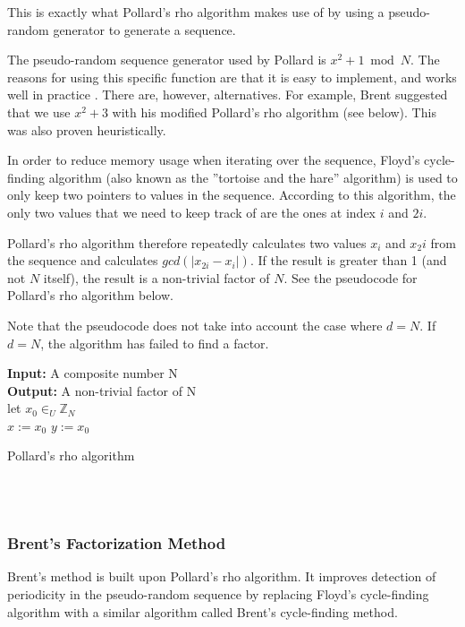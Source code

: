 \documentclass[paper=a4, fontsize=11pt,numbers=endperiod]{scrartcl} %
\providecommand{\abs}[1]{\lvert#1\rvert} %
\numberwithin{equation}{section} %
\numberwithin{figure}{section} %
\numberwithin{table}{section} %
\begin{document}
This is exactly what Pollard's rho algorithm makes use of by using a pseudo-random generator to generate a sequence.

The pseudo-random sequence generator used by Pollard is $x^2 + 1 \bmod N$. The reasons for using this specific function are that it is easy to implement, and works well in practice \cite{algnotes}. There are, however, alternatives. For example, Brent suggested that we use $x^2 +3$ with his modified Pollard's rho algorithm (see below). This was also proven heuristically. \cite{brent}

In order to reduce memory usage when iterating over the sequence, Floyd's cycle-finding algorithm (also known as the ''tortoise and the hare'' algorithm) is used to only keep two pointers to values in the sequence.
According to this algorithm, the only two values that we need to keep track of are the ones at index $i$ and $2i$. \cite{floyd}

Pollard's rho algorithm therefore repeatedly calculates two values $x_i$ and $x_2i$ from the sequence and calculates $gcd(\abs{x_{2i}-x_i})$.
If the result is greater than 1 (and not $N$ itself), the result is a non-trivial factor of $N$.
See the pseudocode for Pollard's rho algorithm below.

Note that the pseudocode does not take into account the case where $d = N$.
If $d = N$, the algorithm has failed to find a factor.

\begin{algorithm}[H]
 \SetAlgoLined %
 \textbf{Input:} {A composite number N}\\
 \textbf{Output:} {A non-trivial factor of N}\\
 let $x_0 \in_U \mathbb{Z}_N$\\
 $x := x_0$\;
 $y := x_0$\;
 \While{True}{
  $x := f(x)$\;
  $y := f(f(y))$\;
  $d := gcd( \abs{y-x}, N)$\;
  \If{$d > 1$}{
   return d\;
   }
 }
 \caption{Pollard's rho algorithm \cite{algnotes}}
\end{algorithm}
\hspace{0pt}\\\\


\subsubsection{Brent's Factorization Method}
Brent's method is built upon Pollard's rho algorithm.
It improves detection of periodicity in the pseudo-random sequence by replacing Floyd's cycle-finding algorithm with a similar algorithm called Brent's cycle-finding method. \cite{brent}
\end{document}
